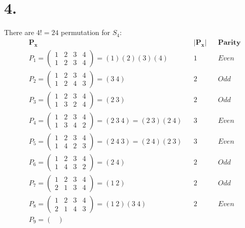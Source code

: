 \documentclass{article}
\begin{document}
\section*{4.} 
There are $4!=24$ permutation for $S_4$:
\begin{align*}
  &\boldsymbol{P_{x}} &&\boldsymbol{|P_{x}|} &&\boldsymbol{Parity} \\
  &P_1 = \begin{pmatrix}
    1 & 2 & 3 & 4 \\
    1 & 2 & 3 & 4
  \end{pmatrix} = (1) (2) (3) (4) &&1 &&Even \\
  &P_2 = \begin{pmatrix}
    1 & 2 & 3 & 4 \\
    1 & 2 & 4 & 3
  \end{pmatrix} = (3 \ 4) &&2 &&Odd
  \\
  &P_3 = \begin{pmatrix}
    1 & 2 & 3 & 4 \\
    1 & 3 & 2 & 4
  \end{pmatrix} = (2 \ 3) &&2 &&Odd
  \\
  &P_4 = \begin{pmatrix}
    1 & 2 & 3 & 4 \\
    1 & 3 & 4 & 2
  \end{pmatrix} = (2 \ 3 \ 4) = (2 \ 3) (2 \ 4) &&3 &&Even
  \\
  &P_5 = \begin{pmatrix}
    1 & 2 & 3 & 4 \\
    1 & 4 & 2 & 3
  \end{pmatrix} = (2 \ 4 \ 3) = (2 \ 4) (2 \ 3) &&3 &&Even
  \\
  &P_6 = \begin{pmatrix}
    1 & 2 & 3 & 4 \\
    1 & 4 & 3 & 2
  \end{pmatrix} = (2 \ 4) &&2 &&Odd
  \\
  &P_7 = \begin{pmatrix}
    1 & 2 & 3 & 4 \\
    2 & 1 & 3 & 4
  \end{pmatrix} = (1 \ 2) &&2 &&Odd
  \\
  &P_8 = \begin{pmatrix}
    1 & 2 & 3 & 4 \\
    2 & 1 & 4 & 3
  \end{pmatrix} = (1 \ 2) (3 \ 4) &&2 &&Even
  \\
  &P_9 = \begin{pmatrix}

\end{pmatrix}
\end{align*}
\end{document}
